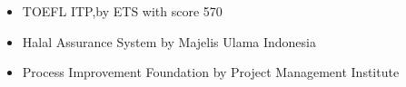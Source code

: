 %
%
%

\twocolumnsection
{
\begin{skills}
\end{skills}}
{
\vspace{1em}
\begin{itemize}
	\item TOEFL ITP,by ETS with score 570
	\item Halal Assurance System by Majelis Ulama Indonesia                
    \item Process Improvement Foundation by Project Management Institute
\end{itemize}
}

